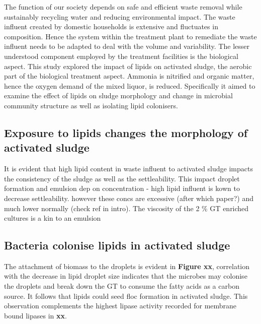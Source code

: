 \documentclass[11pt]{article}
\begin{document}
The function of our society depends on safe and efficient waste removal while sustainably recycling water and reducing environmental impact. The waste influent created by domestic households is extensive and fluctuates in composition. Hence the system within the treatment plant to remediate the waste influent needs to be adapted to deal with the volume and variability. The lesser understood component employed by the treatment facilities is the biological aspect. This study explored the impact of lipids on activated sludge, the aerobic part of the biological treatment aspect. Ammonia is nitrified and organic matter, hence the oxygen demand of the mixed liquor, is reduced. Specifically it aimed to examine the effect of lipids on sludge morphology and change in microbial community structure as well as isolating lipid colonisers.
\subsection{Exposure to lipids changes the morphology of activated sludge}
It is evident that high lipid content in waste influent to activated sludge impacts the consistency of the sludge as well as the settleability. This impact droplet formation and emulsion dep on concentration - high lipid influent is kown to decrease settleability. however these concs are excessive (after which paper?) and much lower normally (check ref in intro). The viscosity of the 2 \% GT enriched cultures is a kin to an emulsion

\subsection{Bacteria colonise lipids in activated sludge}




The attachment of biomass to the droplets is evident in \textbf{Figure xx}, correlation with the decrease in lipid droplet size indicates that the microbes may colonise the droplets and break down the GT to consume the fatty acids as a carbon source. It follows that lipids could seed floc formation in activated sludge. This observation complements the highest lipase activity recorded for membrane bound lipases in \textbf{xx}.
\end{document}

